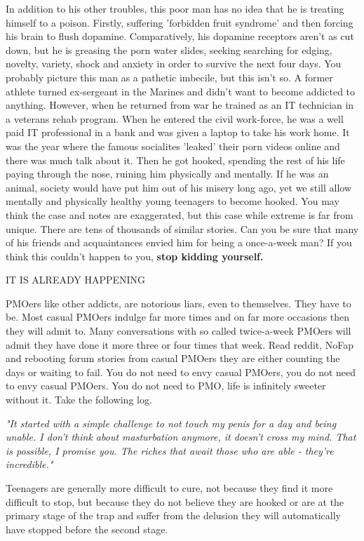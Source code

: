 In addition to his other troubles, this poor man has no idea that he is treating himself to a poison. Firstly, suffering 'forbidden fruit syndrome' and then forcing his brain to flush dopamine. Comparatively, his dopamine receptors aren't as cut down, but he is greasing the porn water slides, seeking searching for edging, novelty, variety, shock and anxiety in order to survive the next four days. You probably picture this man as a pathetic imbecile, but this isn't so. A former athlete turned ex-sergeant in the Marines and didn't want to become addicted to anything. However, when he returned from war he trained as an IT technician in a veterans rehab program. When he entered the civil work-force, he was a well paid IT professional in a bank and was given a laptop to take his work home. It was the year where the famous socialites 'leaked' their porn videos online and there was much talk about it. Then he got hooked, spending the rest of his life paying through the nose, ruining him physically and mentally. If he was an animal, society would have put him out of his misery long ago, yet we still allow mentally and physically healthy young teenagers to become hooked. You may think the case and notes are exaggerated, but this case while extreme is far from unique. There are tens of thousands of similar stories. Can you be sure that many of his friends and acquaintances envied him for being a once-a-week man? If you think this couldn't happen to you, \textbf{stop kidding yourself.}

\huge{IT IS ALREADY HAPPENING}

PMOers like other addicts, are notorious liars, even to themselves. They have to be. Most casual PMOers indulge far more times and on far more occasions then they will admit to. Many conversations with so called twice-a-week PMOers will admit they have done it more three or four times that week. Read reddit, NoFap and rebooting forum stories from casual PMOers they are either counting the days or waiting to fail. You do not need to envy casual PMOers, you do not need to envy casual PMOers. You do not need to PMO, life is infinitely sweeter without it. Take the following log.

  \textit{"It started with a simple challenge to not touch my penis for a day and being unable. I don't think about masturbation anymore, it doesn't cross my mind. That is possible, I promise you. The riches that await those who are able - they're incredible."}

Teenagers are generally more difficult to cure, not because they find it more difficult to stop, but because they do not believe they are hooked or are at the primary stage of the trap and suffer from the delusion they will automatically have stopped before the second stage.

